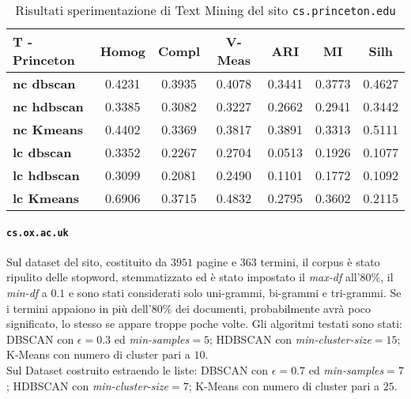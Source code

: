 \begin{table}[H]
	\begin{tabular}{| l | c | c | c | c | c | c |}
	\hline
	\textbf{T - Princeton}  & \textbf{Homog} & \textbf{Compl} & \textbf{V-Meas}  & \textbf{ARI}  & \textbf{MI}  & \textbf{Silh} \\ [3ex] \hline
	\textbf{nc dbscan} & 0.4231 & 0.3935 & 0.4078 & 0.3441 & 0.3773 & 0.4627\\ [3ex]
	 \hline 
	\textbf{nc hdbscan} & 0.3385 & 0.3082 & 0.3227 & 0.2662 & 0.2941 & 0.3442\\ [3ex]
	 \hline
	\textbf{nc Kmeans} & 0.4402 & 0.3369 & 0.3817 & 0.3891 & 0.3313 & 0.5111\\ [3ex]
	 \hline	
	\textbf{lc dbscan} & 0.3352 & 0.2267 & 0.2704 & 0.0513 & 0.1926 & 0.1077\\ [3ex]
	\hline
	\textbf{lc hdbscan} & 0.3099 & 0.2081 & 0.2490 & 0.1101 & 0.1772 & 0.1092\\ [3ex]
	\hline
	\textbf{lc Kmeans} & 0.6906 & 0.3715 & 0.4832 & 0.2795 & 0.3602 & 0.2115\\ [3ex]
	\hline
	\end{tabular}
	\caption{Risultati sperimentazione di Text Mining del sito \texttt{cs.princeton.edu}}
	\label{metricheTextPrinc}
\end{table}

\paragraph{\texttt{cs.ox.ac.uk}}
Sul dataset del sito, costituito da $3951$ pagine e $363$ termini, il corpus è stato ripulito delle stopword, stemmatizzato ed è stato impostato il \textit{max-df} all'80\%, il \textit{min-df} a $0.1$ e sono stati considerati solo uni-grammi, bi-grammi e tri-grammi. Se i termini appaiono in più dell'80\% dei documenti, probabilmente avrà poco significato, lo stesso se appare troppe poche volte. Gli algoritmi testati sono stati: DBSCAN con $\epsilon = 0.3$ ed \textit{min-samples}$ = 5$; HDBSCAN con \textit{min-cluster-size}$=15$; K-Means con numero di cluster pari a $10$. \\Sul Dataset costruito estraendo le liste: DBSCAN con $\epsilon = 0.7$ ed \textit{min-samples}$ = 7$; HDBSCAN con \textit{min-cluster-size}$=7$; K-Means con numero di cluster pari a $25$. 

